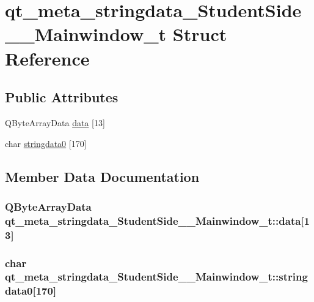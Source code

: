 \hypertarget{structqt__meta__stringdata___student_side_____mainwindow__t}{\section{qt\-\_\-meta\-\_\-stringdata\-\_\-\-Student\-Side\-\_\-\-\_\-\-Mainwindow\-\_\-t Struct Reference}
\label{structqt__meta__stringdata___student_side_____mainwindow__t}
}
\subsection*{Public Attributes}
\begin{DoxyCompactItemize}
\item 
Q\-Byte\-Array\-Data \hyperlink{structqt__meta__stringdata___student_side_____mainwindow__t_a39adab4b00e2782b480371d73284c994}{data} \mbox{[}13\mbox{]}
\item 
char \hyperlink{structqt__meta__stringdata___student_side_____mainwindow__t_a057923bb25e107d04dccc85482f7e9dd}{stringdata0} \mbox{[}170\mbox{]}
\end{DoxyCompactItemize}


\subsection{Member Data Documentation}
\hypertarget{structqt__meta__stringdata___student_side_____mainwindow__t_a39adab4b00e2782b480371d73284c994}{
\subsubsection[{data}]{\setlength{\rightskip}{0pt plus 5cm}Q\-Byte\-Array\-Data qt\-\_\-meta\-\_\-stringdata\-\_\-\-Student\-Side\-\_\-\-\_\-\-Mainwindow\-\_\-t\-::data\mbox{[}13\mbox{]}}}\label{structqt__meta__stringdata___student_side_____mainwindow__t_a39adab4b00e2782b480371d73284c994}
\hypertarget{structqt__meta__stringdata___student_side_____mainwindow__t_a057923bb25e107d04dccc85482f7e9dd}{
\subsubsection[{stringdata0}]{\setlength{\rightskip}{0pt plus 5cm}char qt\-\_\-meta\-\_\-stringdata\-\_\-\-Student\-Side\-\_\-\-\_\-\-Mainwindow\-\_\-t\-::stringdata0\mbox{[}170\mbox{]}}}\label{structqt__meta__stringdata___student_side_____mainwindow__t_a057923bb25e107d04dccc85482f7e9dd}


